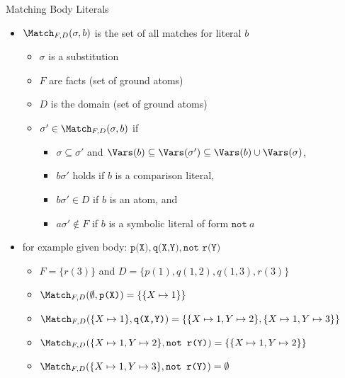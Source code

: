 \begin{frame}{Matching Body Literals}
    \begin{itemize}
      \item \(\Match_{F,D}(\sigma,b)\) is the set of \alert{all matches for literal} \(b\)
        \begin{itemize}
          \item \(\sigma\) is a substitution
          \item \(F\) are facts (set of ground atoms)
          \item \(D\) is the domain (set of ground atoms)
          \item \(\sigma' \in \Match_{F,D}(\sigma,b)\) if
            \begin{itemize}
              \item \(\sigma \subseteq \sigma'\) and \(\Vars(b) \subseteq \Vars(\sigma') \subseteq \Vars(b) \cup \Vars(\sigma)\),
              \item \(b\sigma'\) holds if \(b\) is a comparison literal,
              \item \(b\sigma' \in D\) if \(b\) is an atom, and
              \item \(a\sigma' \not\in F\) if \(b\) is a symbolic literal of form \(\texttt{not}\ a\)
            \end{itemize}
        \end{itemize}
      \pause
      \item for \alert{example} given body:  \(\texttt{p(X)},\texttt{q(X,Y)},\texttt{not r(Y)}\)
        \begin{itemize}
          \item \(F = \{r(3)\}\) and \(D = \{p(1), q(1,2), q(1,3), r(3)\}\)
          \item \(\Match_{F,D}(\emptyset, \texttt{p(X)}) = \{ \{ X \mapsto 1 \} \}\)
          \item \(\Match_{F,D}(\{X \mapsto 1\}, \texttt{q(X,Y)}) = \{ \{ X \mapsto 1, Y \mapsto 2 \}, \{ X \mapsto 1, Y \mapsto 3 \} \}\)
          \item \(\Match_{F,D}(\{X \mapsto 1, Y \mapsto 2 \}, \texttt{not r(Y)}) = \{ \{ X \mapsto 1, Y \mapsto 2 \} \}\)
          \item \(\Match_{F,D}(\{X \mapsto 1, Y \mapsto 3 \}, \texttt{not r(Y)}) = \emptyset\)
        \end{itemize}
    \end{itemize}
\end{frame}

